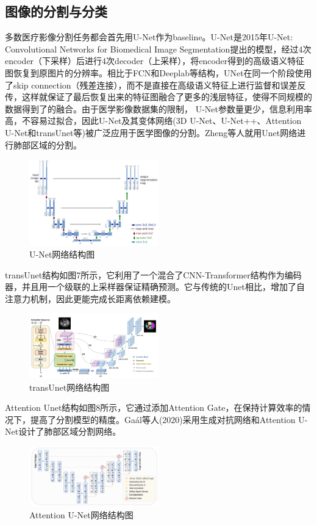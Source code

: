 \documentclass[journal,twoside,web]{ieeecolor}
\begin{document}
\subsection{图像的分割与分类}
多数医疗影像分割任务都会首先用U-Net作为baseline。U-Net是2015年U-Net: Convolutional Networks for Biomedical Image Segmentation提出的模型，经过4次encoder（下采样）后进行4次decoder（上采样），将encoder得到的高级语义特征图恢复到原图片的分辨率。相比于FCN和Deeplab等结构，UNet在同一个阶段使用了skip connection（残差连接），而不是直接在高级语义特征上进行监督和误差反传，这样就保证了最后恢复出来的特征图融合了更多的浅层特征，使得不同规模的数据得到了的融合。由于医学影像数据集的限制， U-Net参数量更少，信息利用率高，不容易过拟合，因此U-Net及其变体网络(3D U-Net、U-Net++、Attention U-Net和transUnet等)被广泛应用于医学图像的分割。Zheng等人就用Unet网络进行肺部区域的分割。
\begin{figure}[h]
\centering
\includegraphics[width=0.5\textwidth]{img/fig8.png}
\caption{U-Net网络结构图}
\label{fig:U-Net}
\end{figure}

transUnet结构如图7所示，它利用了一个混合了CNN-Transformer结构作为编码器，并且用一个级联的上采样器保证精确预测。它与传统的Unet相比，增加了自注意力机制，因此更能完成长距离依赖建模。
\begin{figure}[h]
\centering
\includegraphics[width=0.5\textwidth]{img/fig9.png}
\caption{transUnet网络结构图}
\label{fig:transUnet}
\end{figure}

Attention Unet结构如图8所示，它通过添加Attention Gate，在保持计算效率的情况下，提高了分割模型的精度。Gaál等人(2020)采用生成对抗网络和Attention U-Net设计了肺部区域分割网络。
\begin{figure}[h]
\centering
\includegraphics[width=0.5\textwidth]{img/fig10.png}
\caption{Attention U-Net网络结构图}
\label{fig:Attention U-Net}
\end{figure}
\end{document}
